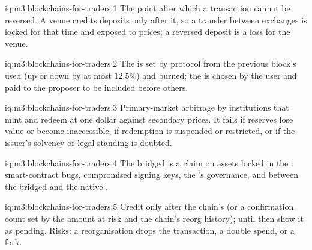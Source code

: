 \begin{solution}{iq:m3:blockchains-for-traders:1}
The point after which a transaction cannot be reversed. A venue credits deposits only after it, so a transfer
between exchanges is locked for that time and exposed to prices; a reversed deposit is a loss for the venue.
\end{solution}

\begin{solution}{iq:m3:blockchains-for-traders:2}
The  is set by protocol from the previous block's  used (up or down by at most 12.5\%) and burned; the
 is chosen by the user and paid to the proposer to be included before others.
\end{solution}

\begin{solution}{iq:m3:blockchains-for-traders:3}
Primary-market arbitrage by institutions that mint and redeem at one dollar against secondary prices. It fails if
reserves lose value or become inaccessible, if redemption is suspended or restricted, or if the issuer's solvency or
legal standing is doubted.
\end{solution}

\begin{solution}{iq:m3:blockchains-for-traders:4}
The bridged  is a claim on assets locked in the : smart-contract bugs, compromised signing keys, the
's governance, and  between the bridged and the native .
\end{solution}

\begin{solution}{iq:m3:blockchains-for-traders:5}
Credit only after the chain's  (or a confirmation count set by the amount at risk and the chain's reorg
history); until then show it as pending. Risks: a reorganisation drops the transaction, a double spend, or a
fork.
\end{solution}

